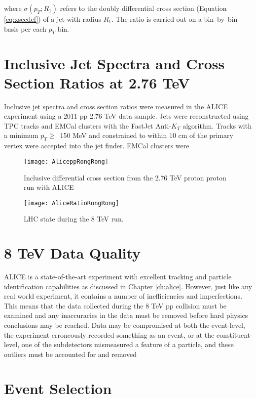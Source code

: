 \noindent
where $\sigma(p_{T};R_{1})$ refers to the doubly differential cross section (Equation \ref{eq:xsecdef}) of a jet with radius $R_{1}$.  The ratio is carried out on a bin--by--bin basis per each $p_{T}$ bin.  

\section{Inclusive Jet Spectra and Cross Section Ratios at 2.76 TeV}
Inclusive jet spectra and cross section ratios were measured in the ALICE experiment using a 2011 pp 2.76 TeV data sample\cite{MA2013319}.  Jets were reconstructed using TPC tracks and EMCal clusters with the FastJet Anti-$K_{T}$ algorithm.  Tracks with a minimum $p_{T} \geq \,$ 150 MeV and constrained to within 10 cm of the primary vertex were accepted into the jet finder.  EMCal clusters were 

\begin{figure}[h]
\texttt{[image: AliceppRongRong]}
\centering
\caption{Inclusive differential cross section from the 2.76 TeV proton proton run with ALICE}
\label{fig:RunEff}
\end{figure}

\begin{figure}[h]
\texttt{[image: AliceRatioRongRong]}
\centering
\caption{LHC state during the 8 TeV run. }
\label{fig:RunEff}
\end{figure}

\section{8 TeV Data Quality}
ALICE is a state-of-the-art experiment with excellent tracking and particle identification capabilities as discussed in Chapter \ref{ch:alice}.  However, just like any real world experiment, it contains a number of inefficiencies and imperfections.  This means that the data collected during the 8 TeV pp collision must be examined and any inaccuracies in the data must be removed before hard physics conclusions may be reached.  Data may be compromised at both the event-level, the experiment erroneously recorded something as an event, or at the constituent-level, one of the subdetectors mismeasured a feature of a particle, and these outliers must be accounted for and removed 
\section{Event Selection}

